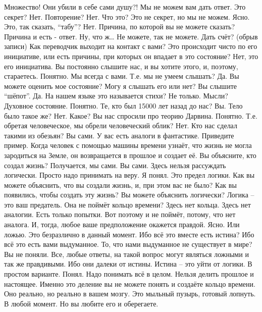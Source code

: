 \documentclass{extbook}
\newcommand{\soul}[1]{{#1}}
\newcommand{\people}[1]{{#1}}
\newcommand{\comment}[1]{{#1}}
\begin{document}
\soul{Множество!}
\people{Они убили в себе сами  душу?!}
\soul{Мы не можем  вам дать ответ.}
\people{Это секрет?}
\soul{Нет.}
\people{Повторение?}
\soul{Нет.}
\people{Что это?}
\soul{Это не секрет, но мы не можем.}
\people{Ясно. Это, так сказать, ``табу''?}
\soul{Нет.}
\people{Причина, по которой вы не можете сказать?}
\soul{Причина и есть - ответ.}
\people{Ну, что ж… Не можете, так не можете. Дать счёт?}
\comment{(обрыв записи)}
\people{Как переводчик выходит на контакт с вами? Это происходит чисто по его инициативе, или есть причины, при которых он впадает в это состояние?}
\soul{Нет, это его инициатива. Вы постоянно слышите нас, и вы хотите этого, и, поэтому, стараетесь.}
\people{Понятно.}
\soul{Мы всегда с вами.}
\people{Т.е. мы не умеем слышать?}
\soul{Да.}
\people{Вы можете оценить мое состояние? Могу я слышать его или нет?}
\soul{Вы слышите ``шёпот''.}
\people{Да. На нашем языке это называется стихи?}
\soul{Не только.}
\people{Мысли?}
\soul{Духовное состояние.}
\people{Понятно. Те, кто был 15000 лет назад  до нас?}
\soul{Вы.}
\people{Тело было такое же?}
\soul{Нет.}
\people{Какое?}
\soul{Вы нас спросили про теорию Дарвина.}
\people{Понятно. Т.е. обретая человеческое, мы обрели человеческий облик?}
\soul{Нет.}
\people{Кто нас сделал такими из обезьян?}
\soul{Вы сами. У вас есть аналоги в фантастике.}
\people{Приведите пример.}
\soul{Когда человек с помощью машины времени узнаёт,  что жизнь не могла зародиться на      Земле, он возвращается в прошлое и создает её. Вы объясните, кто создал жизнь?}
\people{Получается, мы сами.}
\soul{Вы сами. Здесь нельзя рассуждать логически. Просто надо принимать на веру.}
\people{Я понял. Это предел логики.}
\soul{Как вы можете объяснить, что вы создали жизнь, и, при этом вас не было? Как вы появились, чтобы создать эту жизнь? Вы можете объяснить логически? Логика – это ваш предатель.}
\people{Она не поймёт кольцо времени?}
\soul{Здесь нет кольца. Здесь нет аналогии. Есть только попытки.}
\people{Вот поэтому и не поймёт, потому, что нет аналога. }
\soul{И, тогда,  любое ваше предположение окажется  правдой.}
\people{Ясно.}
\soul{Или ложью. Это безразлично в данный момент. }
\people{Ибо всё это вместе есть истина?}
\soul{Ибо всё это есть вами выдуманное.}
\people{То, что нами выдуманное не существует в мире?}
\soul{Вы не поняли. Все, любые ответы, на такой вопрос могут являться ложными и так же правдивыми. Ибо они далеки от истины. Истина – это уйти от логики. В простом варианте.}
\people{Понял.}
\soul{Надо понимать всё в целом. Нельзя делить прошлое и настоящее. Именно это деление вы не можете понять и создаёте кольцо времени. Оно реально, но реально в вашем мозгу. Это мыльный пузырь, готовый лопнуть. В любой момент. Но вы любите его и оберегаете.}
\end{document}
